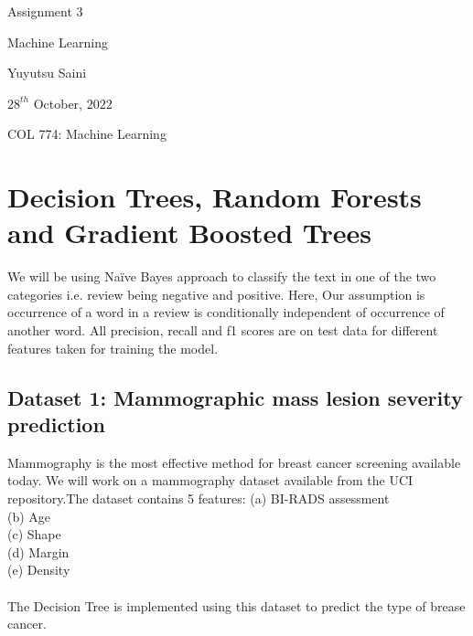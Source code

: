 \documentclass[11pt]{article}
\newcommand\titleofdoc{Assignment 3}
\newcommand\GroupName{Machine Learning}
\begin{document}
\begin{center}
        \vspace*{2cm} %

        \Huge{\titleofdoc} 
            
        \vspace{2 cm}
        \Large{\GroupName}
       
        \vspace{0.25cm}
        \large{Yuyutsu Saini}
       
        \vspace{3 cm}
        \Large{$28^{th}$ October, $2022$}
        
        \vspace{0.25 cm}
        \Large{COL 774: Machine Learning}
\end{center}
\vspace{1cm}
\tableofcontents

\section{Decision Trees, Random Forests and Gradient Boosted Trees}

We will be using Na\"{i}ve Bayes approach to classify the text in one of the two categories i.e. review being negative and positive. Here, Our assumption is occurrence of a word in a review is conditionally independent of occurrence of another word. All precision, recall and f1 scores are on test data for different features taken for training the model.



\subsection{Dataset 1: Mammographic mass lesion severity prediction}
Mammography is the most effective method for breast cancer screening available today.
We will work on a mammography dataset available from the
UCI repository.The dataset contains 5 features: (a) BI-RADS assessment \\
(b) Age \\ (c) Shape \\ (d) Margin \\ (e) Density \\ \\
The Decision Tree is implemented using this dataset to predict the type of brease cancer.
\end{document}
